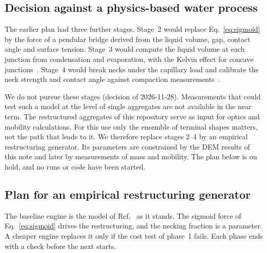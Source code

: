 \documentclass[11pt,a4paper]{article}
\begin{document}
\subsection{Decision against a physics-based water process}
\label{sec:no-physics}

The earlier plan had three further stages.
Stage~2 would replace Eq.~\eqref{eq:sigmoid} by the force of a pendular bridge derived from the liquid volume, gap, contact angle and surface tension.
Stage~3 would compute the liquid volume at each junction from condensation and evaporation, with the Kelvin effect for concave junctions~\cite{ivanova2020}.
Stage~4 would break necks under the capillary load and calibrate the neck strength and contact angle against compaction measurements~\cite{chen2018,enekwizu2021,bhandari2019}.

We do not pursue these stages (decision of 2026-11-28).
Measurements that could test such a model at the level of single aggregates are not available in the near term.
The restructured aggregates of this repository serve as input for optics and mobility calculations.
For this use only the ensemble of terminal shapes matters, not the path that leads to it.
We therefore replace stages 2--4 by an empirical restructuring generator.
Its parameters are constrained by the DEM results of this note and later by measurements of mass and mobility.
The plan below is on hold, and no runs or code have been started.

\subsection{Plan for an empirical restructuring generator}
\label{sec:empirical-plan}

The baseline engine is the model of Ref.~\cite{demidov2024} as it stands.
The sigmoid force of Eq.~\eqref{eq:sigmoid} drives the restructuring, and the necking fraction is a parameter.
A cheaper engine replaces it only if the cost test of phase~1 fails.
Each phase ends with a check before the next starts.
\end{document}
